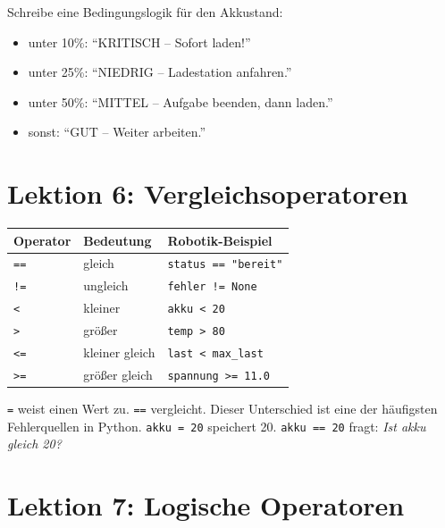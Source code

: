 \begin{uebung}[title=Übung 2.1: Akkumanagement]
Schreibe eine Bedingungslogik für den Akkustand:
\begin{itemize}
    \item unter 10\%: ``KRITISCH -- Sofort laden!''
    \item unter 25\%: ``NIEDRIG -- Ladestation anfahren.''
    \item unter 50\%: ``MITTEL -- Aufgabe beenden, dann laden.''
    \item sonst: ``GUT -- Weiter arbeiten.''
\end{itemize}
\end{uebung}

\section{Lektion 6: Vergleichsoperatoren}

\begin{center}
\begin{tabular}{lll}
\toprule
\textbf{Operator} & \textbf{Bedeutung} & \textbf{Robotik-Beispiel} \\
\midrule
\texttt{==} & gleich            & \texttt{status == "bereit"} \\
\texttt{!=} & ungleich          & \texttt{fehler != None} \\
\texttt{<}  & kleiner           & \texttt{akku < 20} \\
\texttt{>}  & größer            & \texttt{temp > 80} \\
\texttt{<=} & kleiner gleich    & \texttt{last < max\_last} \\
\texttt{>=} & größer gleich     & \texttt{spannung >= 11.0} \\
\bottomrule
\end{tabular}
\end{center}

\begin{merksatz}
\texttt{=} weist einen Wert zu. \texttt{==} vergleicht. Dieser Unterschied ist eine der häufigsten Fehlerquellen in Python. \texttt{akku = 20} speichert 20. \texttt{akku == 20} fragt: \textit{Ist akku gleich 20?}
\end{merksatz}

\section{Lektion 7: Logische Operatoren}

